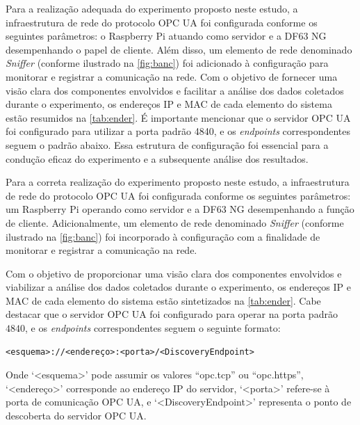     Para a realização adequada do experimento proposto neste estudo, a infraestrutura de rede do protocolo OPC UA foi configurada conforme os seguintes parâmetros: o Raspberry Pi atuando como servidor e a DF63 NG desempenhando o papel de cliente. Além disso, um elemento de rede denominado \textit{Sniffer} (conforme ilustrado na \autoref{fig:banc}) foi adicionado à configuração para monitorar e registrar a comunicação na rede. Com o objetivo de fornecer uma visão clara dos componentes envolvidos e facilitar a análise dos dados coletados durante o experimento, os endereços IP e MAC de cada elemento do sistema estão resumidos na \autoref{tab:ender}. É importante mencionar que o servidor OPC UA foi configurado para utilizar a porta padrão 4840, e os \textit{endpoints} correspondentes seguem o padrão abaixo. Essa estrutura de configuração foi essencial para a condução eficaz do experimento e a subsequente análise dos resultados.

    Para a correta realização do experimento proposto neste estudo, a infraestrutura de rede do protocolo OPC UA foi configurada conforme os seguintes parâmetros: um Raspberry Pi operando como servidor e a DF63 NG desempenhando a função de cliente. Adicionalmente, um elemento de rede denominado \textit{Sniffer} (conforme ilustrado na \autoref{fig:banc}) foi incorporado à configuração com a finalidade de monitorar e registrar a comunicação na rede. 

    Com o objetivo de proporcionar uma visão clara dos componentes envolvidos e viabilizar a análise dos dados coletados durante o experimento, os endereços IP e MAC de cada elemento do sistema estão sintetizados na \autoref{tab:ender}. Cabe destacar que o servidor OPC UA foi configurado para operar na porta padrão $4840$, e os \textit{endpoints} correspondentes seguem o seguinte formato:

    \begin{verbatim}
<esquema>://<endereço>:<porta>/<DiscoveryEndpoint>
    \end{verbatim}

    Onde `<esquema>' pode assumir os valores ``opc.tcp'' ou ``opc.https'', `<endereço>' corresponde ao endereço IP do servidor, `<porta>' refere-se à porta de comunicação OPC UA, e `<DiscoveryEndpoint>' representa o ponto de descoberta do servidor OPC UA.

